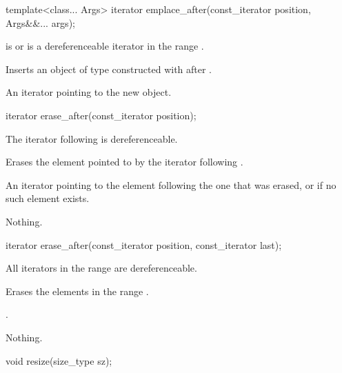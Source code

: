 %
\begin{itemdecl}
template<class... Args>
  iterator emplace_after(const_iterator position, Args&&... args);
\end{itemdecl}

\begin{itemdescr}
\pnum
\requires {} is  or is a dereferenceable
iterator in the range .

\pnum
\effects Inserts an object of type  constructed with
 after .

\pnum
\returns An iterator pointing to the new object.
\end{itemdescr}

%
\begin{itemdecl}
iterator erase_after(const_iterator position);
\end{itemdecl}

\begin{itemdescr}
\pnum
\requires The iterator following  is dereferenceable.

\pnum
\effects Erases the element pointed to by the iterator following .

\pnum
\returns An iterator pointing to the element following the one that was
erased, or  if no such element exists.

\pnum
\throws Nothing.
\end{itemdescr}

\begin{itemdecl}
iterator erase_after(const_iterator position, const_iterator last);
\end{itemdecl}

\begin{itemdescr}
\pnum
\requires All iterators in the range  are dereferenceable.

\pnum
\effects Erases the elements in the range .

\pnum
\returns {}.

\pnum
\throws Nothing.
\end{itemdescr}

%
\begin{itemdecl}
void resize(size_type sz);
\end{itemdecl}

